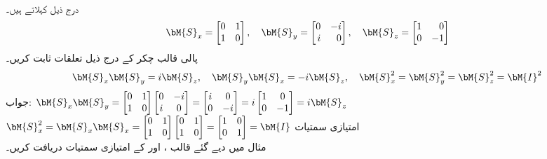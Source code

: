 \quad {} \\
درج ذیل  کہلاتے ہیں۔
\begin{align}
\bM{S}_x=\begin{bmatrix*}[r] 0&1\\1&0 \end{bmatrix*},\quad \bM{S}_y=\begin{bmatrix*}[r] 0&-i\\i&0 \end{bmatrix*},\quad \bM{S}_z=\begin{bmatrix*}[r] 1&0\\0&-1 \end{bmatrix*}
\end{align}
پالی قالب چکر کے درج ذیل تعلقات ثابت کریں۔
\begin{align}
\bM{S}_x\bM{S}_y=i\bM{S}_z,\quad \bM{S}_y\bM{S}_x=-i\bM{S}_z,\quad \bM{S}_x^2=\bM{S}_y^2=\bM{S}_z^2=\bM{I}^2
\end{align}
جواب:
$\bM{S}_x\bM{S}_y=\begin{bmatrix} 0&1\\1&0 \end{bmatrix}\begin{bmatrix} 0&-i\\i&0 \end{bmatrix}=\begin{bmatrix} i&0\\0&-i \end{bmatrix}=i\begin{bmatrix} 1&0\\0&-1\end{bmatrix}=i\bM{S}_z$\\
$\bM{S}_x^2=\bM{S}_x\bM{S}_x=\begin{bmatrix}0&1\\1&0  \end{bmatrix}\begin{bmatrix}0&1\\1&0  \end{bmatrix}=\begin{bmatrix}1&0\\0&1  \end{bmatrix}=\bM{I}$
\quad امتیازی سمتیات\\
مثال  میں دیے گئے قالب ،  اور  کے امتیازی سمتیات دریافت کریں۔

